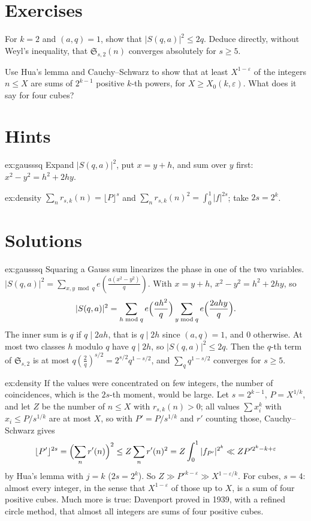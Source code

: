 \section{Exercises}

\begin{exercise}[$\star$]\label{ex:gausssq}
For $k=2$ and $(a,q)=1$, show that $|S(q,a)|^2\le2q$. Deduce directly, without Weyl's inequality, that $\mathfrak S_{s,2}(n)$ converges absolutely for $s\ge5$.
\end{exercise}
\begin{exercise}[$\star\star$]\label{ex:density}
Use Hua's lemma and Cauchy--Schwarz to show that at least $X^{1-\varepsilon}$ of the integers $n\le X$ are sums of $2^{k-1}$ positive $k$-th powers, for $X\ge X_0(k,\varepsilon)$. What does it say for four cubes?
\end{exercise}
\section{Hints}

\begin{hint}{ex:gausssq}
Expand $|S(q,a)|^2$, put $x=y+h$, and sum over $y$ first: $x^2-y^2=h^2+2hy$.
\end{hint}
\begin{hint}{ex:density}
$\sum_nr_{s,k}(n)=\lfloor P\rfloor^s$ and $\sum_nr_{s,k}(n)^2=\int_0^1|f|^{2s}$; take $2s=2^k$.
\end{hint}
\section{Solutions}

\begin{solution}{ex:gausssq}
\idea Squaring a Gauss sum linearizes the phase in one of the two variables.
\writeup $|S(q,a)|^2=\sum_{x,y\bmod q}e(\frac{a(x^2-y^2)}q)$. With $x=y+h$, $x^2-y^2=h^2+2hy$, so
\[
|S(q,a)|^2=\sum_{h\bmod q}e\Bigl(\frac{ah^2}q\Bigr)\sum_{y\bmod q}e\Bigl(\frac{2ahy}q\Bigr).
\]
The inner sum is $q$ if $q\mid2ah$, that is $q\mid2h$ since $(a,q)=1$, and $0$ otherwise. At most two classes $h$ modulo $q$ have $q\mid2h$, so $|S(q,a)|^2\le2q$. Then the $q$-th term of $\mathfrak S_{s,2}$ is at most $q(\frac{2}{q})^{s/2}=2^{s/2}q^{1-s/2}$, and $\sum_qq^{1-s/2}$ converges for $s\ge5$.
\end{solution}
\begin{solution}{ex:density}
\idea If the values were concentrated on few integers, the number of coincidences, which is the $2s$-th moment, would be large.
\writeup Let $s=2^{k-1}$, $P=X^{1/k}$, and let $Z$ be the number of $n\le X$ with $r_{s,k}(n)>0$; all values $\sum x_i^k$ with $x_i\le P/s^{1/k}$ are at most $X$, so with $P'=P/s^{1/k}$ and $r'$ counting those, Cauchy--Schwarz gives
\[
\lfloor P'\rfloor^{2s}=\Bigl(\sum_nr'(n)\Bigr)^2\le Z\sum_nr'(n)^2=Z\int_0^1|f_{P'}|^{2^k}\ll ZP'^{2^k-k+\varepsilon}
\]
by Hua's lemma with $j=k$ ($2s=2^k$). So $Z\gg P'^{k-\varepsilon}\gg X^{1-\varepsilon/k}$. For cubes, $s=4$: almost every integer, in the sense that $X^{1-\varepsilon}$ of those up to $X$, is a sum of four positive cubes. Much more is true: Davenport proved in 1939, with a refined circle method, that almost all integers are sums of four positive cubes.
\end{solution}
